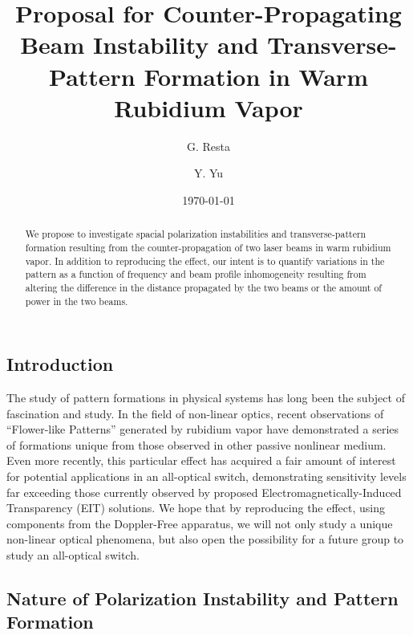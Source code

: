 \documentclass[aps,twocolumn,secnumarabic,balancelastpage,amsmath,amssymb,nofootinbib]{revtex4}
\begin{document}
\title{Proposal for Counter-Propagating Beam Instability and Transverse-Pattern Formation in Warm Rubidium Vapor}
\author{G. Resta}
\author{Y. Yu}
\date{\today}

\begin{abstract}
We propose to investigate spacial polarization instabilities and transverse-pattern formation resulting from the counter-propagation of two laser beams in warm rubidium vapor. In addition to reproducing the effect, our intent is to quantify variations in the pattern as a function of frequency and beam profile inhomogeneity resulting from altering the difference in the distance propagated by the two beams or the amount of power in the two beams. 
\end{abstract}

\maketitle
\subsection*{Introduction}
The study of pattern formations in physical systems has long been the subject of fascination and study. 
In the field of non-linear optics, recent observations of ``Flower-like Patterns'' generated by rubidium vapor have demonstrated a series of formations unique from those observed in other passive nonlinear medium\cite{grynberg93}. Even more recently, this particular effect has acquired a fair amount of interest for potential applications in an all-optical switch, demonstrating sensitivity levels far exceeding those currently observed by proposed Electromagnetically-Induced Transparency (EIT) solutions\cite{duke01}. We hope that by reproducing the effect, using components from the Doppler-Free apparatus, we will not only study a unique non-linear optical phenomena, but also open the possibility for a future group to study an all-optical switch.

\subsection*{Nature of Polarization Instability and Pattern Formation}
\end{document}
